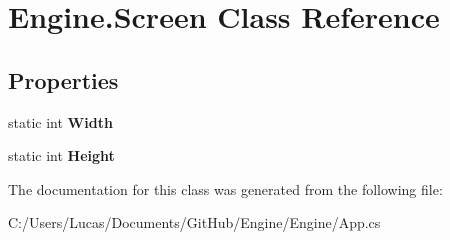 \hypertarget{class_engine_1_1_screen}{\section{Engine.\-Screen Class Reference}
\label{class_engine_1_1_screen}
}
\subsection*{Properties}
\begin{DoxyCompactItemize}
\item 
\hypertarget{class_engine_1_1_screen_a5a198dc68a1028b1345b7c6ca73861d4}{static int {\bfseries Width}}\label{class_engine_1_1_screen_a5a198dc68a1028b1345b7c6ca73861d4}

\item 
\hypertarget{class_engine_1_1_screen_ad7f7bb8c49cf6d21d40b37ed642b05bb}{static int {\bfseries Height}}\label{class_engine_1_1_screen_ad7f7bb8c49cf6d21d40b37ed642b05bb}

\end{DoxyCompactItemize}


The documentation for this class was generated from the following file\-:\begin{DoxyCompactItemize}
\item 
C\-:/\-Users/\-Lucas/\-Documents/\-Git\-Hub/\-Engine/\-Engine/App.\-cs\end{DoxyCompactItemize}
